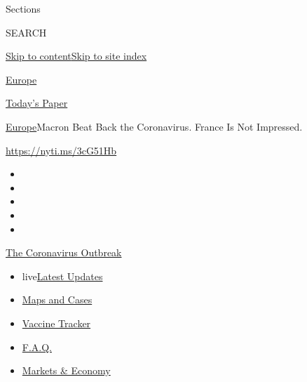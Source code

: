 Sections

SEARCH

\protect\hyperlink{site-content}{Skip to
content}\protect\hyperlink{site-index}{Skip to site index}

\href{https://www.nytimes.com/section/world/europe}{Europe}

\href{https://myaccount.nytimes.com/auth/login?response_type=cookie\&client_id=vi}{}

\href{https://www.nytimes.com/section/todayspaper}{Today's Paper}

\href{/section/world/europe}{Europe}\textbar{}Macron Beat Back the
Coronavirus. France Is Not Impressed.

\href{https://nyti.ms/3cG51Hb}{https://nyti.ms/3cG51Hb}

\begin{itemize}
\item
\item
\item
\item
\item
\end{itemize}

\href{https://www.nytimes.com/news-event/coronavirus?action=click\&pgtype=Article\&state=default\&region=TOP_BANNER\&context=storylines_menu}{The
Coronavirus Outbreak}

\begin{itemize}
\tightlist
\item
  live\href{https://www.nytimes.com/2020/08/08/world/coronavirus-updates.html?action=click\&pgtype=Article\&state=default\&region=TOP_BANNER\&context=storylines_menu}{Latest
  Updates}
\item
  \href{https://www.nytimes.com/interactive/2020/us/coronavirus-us-cases.html?action=click\&pgtype=Article\&state=default\&region=TOP_BANNER\&context=storylines_menu}{Maps
  and Cases}
\item
  \href{https://www.nytimes.com/interactive/2020/science/coronavirus-vaccine-tracker.html?action=click\&pgtype=Article\&state=default\&region=TOP_BANNER\&context=storylines_menu}{Vaccine
  Tracker}
\item
  \href{https://www.nytimes.com/interactive/2020/world/coronavirus-tips-advice.html?action=click\&pgtype=Article\&state=default\&region=TOP_BANNER\&context=storylines_menu}{F.A.Q.}
\item
  \href{https://www.nytimes.com/live/2020/08/07/business/stock-market-today-coronavirus?action=click\&pgtype=Article\&state=default\&region=TOP_BANNER\&context=storylines_menu}{Markets
  \& Economy}
\end{itemize}

